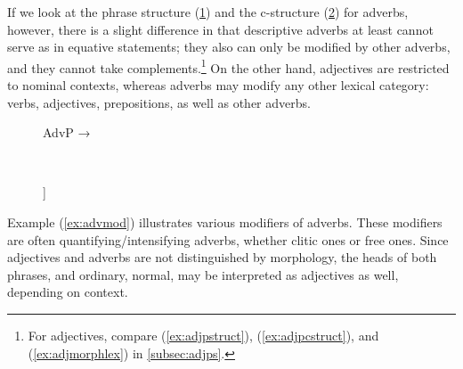 If we look at the phrase structure (\ref{ex:advpstruct}) and the c-structure
(\ref{ex:advpcstruct}) for adverbs, however, there is a slight difference in
that descriptive adverbs at least cannot serve as
\Plink{} in equative
statements; they also can only be modified by other adverbs, and they cannot
take complements.\footnote{For adjectives, compare
(\ref{ex:adjpstruct}), (\ref{ex:adjpcstruct}), and (\ref{ex:adjmorphlex}) in
\autoref{subsec:adjps}.} On the other hand, adjectives are
restricted to nominal contexts, whereas adverbs may modify any other lexical
category: verbs, adjectives,
prepositions, as well as other adverbs.

\begin{figure}
\ex\label{ex:advpstruct}
AdvP →  
\xe
\end{figure}

\begin{figure}
\ex~\label{ex:advpcstruct}
\begin{forest}
[{\anno[\elem{\Adjc}]{AdvP}}
		[\anno{\xhead{Adv}}]
		[{\anno[{\elem{\Adjc}}]{AdvP}}]
]
\end{forest}
\xe
\end{figure}

Example (\ref{ex:advmod}) illustrates various modifiers of adverbs. These
modifiers are often quantifying/intensifying adverbs, whether clitic ones or
free ones. Since adjectives and adverbs are not distinguished by morphology,
the heads of both phrases,  and 
{ordinary, normal}, may be interpreted as adjectives as well, depending on
context.

